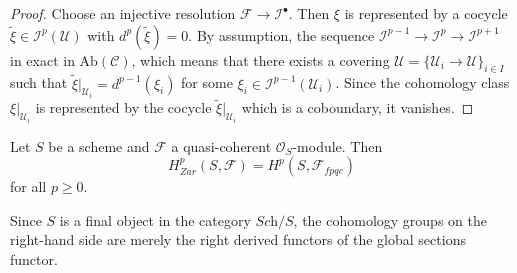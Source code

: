\begin{proof}
Choose an injective resolution $\mathcal{F} \to \mathcal{I}^\bullet$. Then 
$\xi$ is represented by a cocycle $\tilde{\xi} \in \mathcal{I}^p(\mathcal{U})$ 
with $d^p(\tilde{\xi}) = 0$. By assumption, the sequence $\mathcal{I}^{p-1} \to 
\mathcal{I}^{p} \to \mathcal{I}^{p+1}$ in exact in $\text{Ab}(\mathcal{C})$, 
which means that there exists a covering $\mathcal{U} = \{ \mathcal{U}_i \to 
\mathcal{U} \}_{i \in I}$ such that $\tilde{\xi}|_{\mathcal{U}_i} = 
d^{p-1}(\xi_i)$ for some $\xi_i \in \mathcal{I}^{p-1}(\mathcal{U}_i)$. Since 
the cohomology class $\xi|_{\mathcal{U}_i}$ is represented by the cocycle 
$\tilde{\xi}|_{\mathcal{U}_i}$ which is a coboundary, it vanishes.
\end{proof}

\begin{theorem}
\label{theorem-zariski-fpqc-quasi-coherent}
Let $S$ be a scheme and $\mathcal{F}$ a quasi-coherent $\mathcal{O}_S$-module. 
Then 
$$
H_{Zar}^p(S, \mathcal{F}) = H^p(S, \mathcal{F}_{fpqc})
$$
for all $p \geq 0$.
\end{theorem}

\begin{remark}
\label{remark-right-derived-global-sections}
Since $S$ is a final object in the category $\textit{Sch}/S$, the cohomology 
groups on the right-hand side are merely the right derived functors of the 
global sections functor.
\end{remark}

